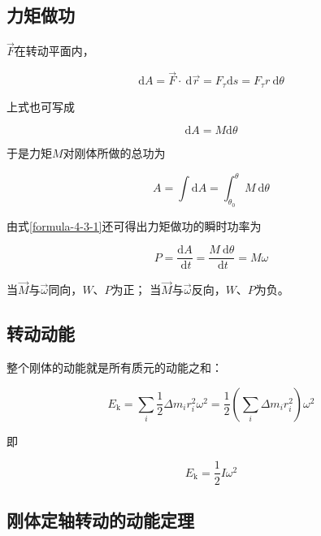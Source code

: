 \documentclass[
	12pt, %
	a4paper, %
]{myLegrandOrangeBook}
\newcommand{\rmd}{\mathrm{d}}
\begin{document}
\subsection{力矩做功}

    \(\overrightarrow{F}\)在转动平面内，

    \begin{equation*}
        \mathrm{d} A=\overrightarrow{F} \cdot \mathrm{~d} \overrightarrow{r}=F_\tau \mathrm{d} s=F_\tau r \mathrm{~d} \theta
        \label{formula-4-3-1}
    \end{equation*}

    上式也可写成

    \begin{equation}
        \mathrm{d} A = M \rmd \theta
    \end{equation}

    于是力矩\(M\)对刚体所做的总功为

    \begin{equation}
        A=\int \mathrm{d} A=\int_{\theta_0}^\theta M \mathrm{~d} \theta
    \end{equation}

    由式\ref{formula-4-3-1}还可得出力矩做功的瞬时功率为

    \begin{equation}
        P=\frac{\mathrm{d} A}{\mathrm{~d} t}=\frac{M \mathrm{~d} \theta}{\mathrm{~d} t}=M \omega
    \end{equation}

    当\(\overrightarrow{M}\)与\(\overrightarrow{\omega}\)同向，\(W\)、\(P\)为正；
    当\(\overrightarrow{M}\)与\(\overrightarrow{\omega}\)反向，\(W\)、\(P\)为负。

\subsection{转动动能}

    整个刚体的动能就是所有质元的动能之和：

    \begin{equation}
        E_{\mathrm{k}}=\sum_i \frac{1}{2} \Delta m_i r_i^2 \omega^2=\frac{1}{2}\left(\sum_i \Delta m_i r_i^2\right) \omega^2
    \end{equation}

    即

    \begin{equation}
        E_{\mathrm{k}}=\frac{1}{2} I \omega^2
    \end{equation}

\subsection{刚体定轴转动的动能定理}
\end{document}
